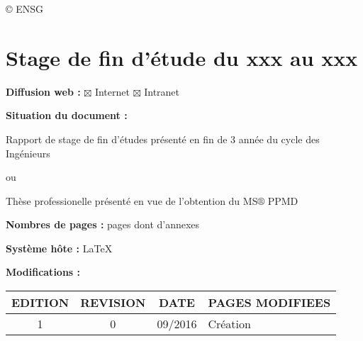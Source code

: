 \copyright \hspace{0.3cm} ENSG

\section*{Stage de fin d'étude du xxx au xxx }
\vspace{0.3cm}
\textbf{Diffusion web :} $\boxtimes$ Internet \hspace{0.2cm}$\boxtimes$ Intranet\hspace{0.2cm}
\vspace{0.3cm}

\textbf{Situation du document :} 
\vspace{0.2cm}
\par
{\color{red}Rapport de stage de fin d'études présenté en fin de 3 année du cycle des Ingénieurs}

ou

{\color{magenta}Thèse professionelle présenté en vue de l'obtention du MS$\circledR$ PPMD}
\vspace{0.3cm}



\textbf{Nombres de pages :}  pages dont  d'annexes
\vspace{0.3cm}

\textbf{Système hôte :} \LaTeX
\vspace{1cm}


\textbf{Modifications :} 
\begin{center}
\begin{tabular}{|c|c|c|>{\centering}p{6.5cm}|}
\hline 
EDITION & REVISION & DATE & PAGES MODIFIEES\tabularnewline
\hline
\hline 
1 & 0 & 09/2016 & Création\tabularnewline
\hline 

\end{tabular}
\end{center}